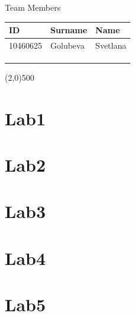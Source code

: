 \documentclass[a4paper,12pt,titlepage]{article} %
\begin{document}
\begin{titlepage}
\vspace{20pt}

\begin{center}
	{\large Team Members}
\end{center}
\begin{tabularx}{\textwidth}{|X|X|X|}
	\hline
	ID & Surname & Name\\
	\hline
	10460625 & Golubeva & Svetlana\\
	\hline
	 &  & \\
	\hline
	 &  & \\
	\hline
	 &  & \\
	\hline
\end{tabularx}

\vspace{\fill}
\begin{center}
	\line(2,0){500}
\end{center}

\end{titlepage}

\tableofcontents


\newpage
\section{Lab1}

\newpage
\section{Lab2}

\newpage
\section{Lab3}

\newpage
\section{Lab4}

\newpage
\section{Lab5}
\end{document}

